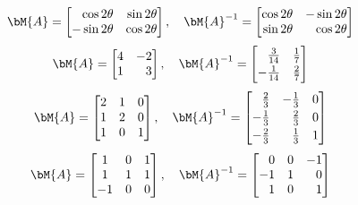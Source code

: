 \begin{align*}
\bM{A}=\begin{bmatrix*}[r]\cos 2\theta&\sin 2\theta\\ -\sin 2\theta&\cos 2\theta  \end{bmatrix*},\quad \bM{A}^{-1}=\begin{bmatrix*}[r] \cos 2\theta&-\sin 2\theta\\ \sin 2\theta&\cos 2\theta  \end{bmatrix*}
\end{align*}
\begin{align*}
\bM{A}=\begin{bmatrix*}[r]4&-2\\1&3  \end{bmatrix*},\quad \bM{A}^{-1}=\begin{bmatrix*}[r] \frac{3}{14}&\frac{1}{7}\\[0.5ex] -\frac{1}{14}&\frac{2}{7} \end{bmatrix*}
\end{align*}
\begin{align*}
\bM{A}=\begin{bmatrix} 2&1&0\\1&2&0\\1&0&1\end{bmatrix},\quad \bM{A}^{-1}=
\begin{bmatrix*}[r]\frac{2}{3}&-\frac{1}{3}&0\\[0.5ex] -\frac{1}{3}&\frac{2}{3}&0\\[0.5ex]-\frac{2}{3}&\frac{1}{3}&1 \end{bmatrix*}
\end{align*}
\begin{align*}
\bM{A}=\begin{bmatrix} 1&0&1\\1&1&1\\-1&0&0\end{bmatrix},\quad \bM{A}^{-1}=
\begin{bmatrix*}[r]0&0&-1\\-1&1&0\\1&0&1 \end{bmatrix*}
\end{align*}
